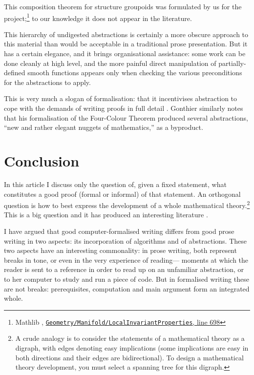 \documentclass[runningheads]{llncs}
\begin{document}
This composition theorem for structure groupoids was formulated by us for the project;\footnote{
  Mathlib \cite{Mathlib}, \href{https://github.com/leanprover-community/mathlib4/blob/21b3a48ba0f69a4ae9eb44dbacbc4de43a6290bf/Mathlib/Geometry/Manifold/LocalInvariantProperties.lean\#L698}{\texttt{Geometry/Manifold/LocalInvariantProperties}, line 698}
} 
to our knowledge it does not appear in the literature.

This hierarchy of undigested abstractions is certainly a more obscure approach to this material
than would be acceptable in a traditional prose presentation.
But it has a certain elegance,
and it brings organisational assistance:
some work can be done cleanly at high level,
and the more painful direct manipulation of partially-defined smooth functions
appears only when checking the various preconditions for the abstractions to apply.

This is very much a slogan of formalisation: that it
incentivises abstraction 
to cope with the demands of writing proofs in full detail \cite{CT24}.
Gonthier \cite{Gon08Notices} similarly notes that his formalisation of the Four-Colour Theorem produced several abstractions, ``new and rather elegant nuggets of mathematics,'' as a byproduct.

\section{Conclusion}

In this article I discuss only the question of,
given a fixed statement,
what constitutes a good proof (formal or informal) of that statement.
An orthogonal question
is how to best express the development of a whole mathematical theory.\footnote{
A crude analogy is to consider the statements of a mathematical theory as a digraph,
with edges denoting easy implications
(some implications are easy in both directions and their edges are bidirectional).
To design a mathematical theory development,
you must select a spanning tree for this digraph.
}
This is a big question and it has produced an interesting literature \cite{ACKMRS20,Gou22}.

I have argued that good computer-formalised writing differs from good prose writing in two aspects:
its incorporation of algorithms and of abstractions.
These two aspects have an interesting commonality:
in prose writing, both represent breaks in tone, or even in the very experience of reading---%
moments at which the reader is sent to a reference in order to read up on an unfamiliar abstraction,
or to her computer to study and run a piece of code.
But in formalised writing these are not breaks:
prerequisites, computation  
and main argument form an integrated whole.
\end{document}
